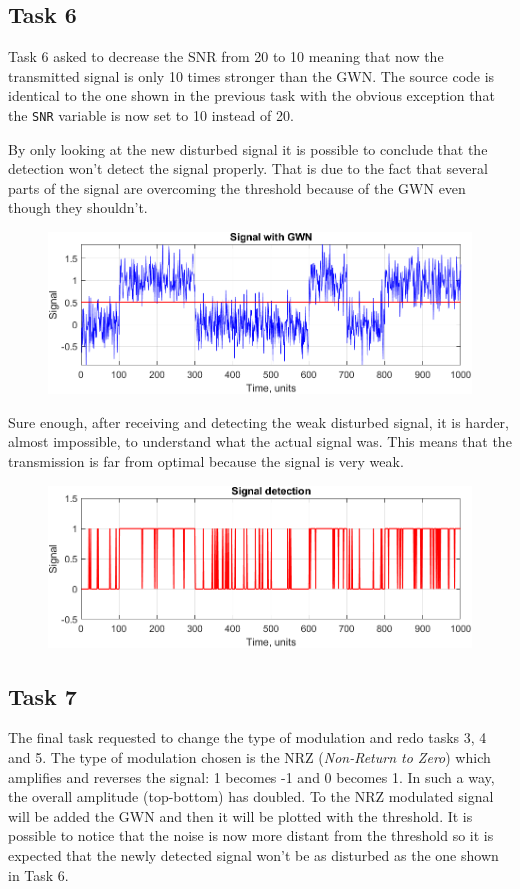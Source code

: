 % 
\subsection*{Task 6}
Task 6 asked to decrease the SNR from 20 to 10 meaning that now the transmitted signal is only 10 times stronger than the GWN. The source code is identical to the one shown in the previous task with the obvious exception that the \texttt{SNR} variable is now set to 10 instead of 20. 

By only looking at the new disturbed signal it is possible to conclude that the detection won't detect the signal properly. That is due to the fact that several parts of the signal are overcoming the threshold because of the GWN even though they shouldn't.
\begin{figure}[h!]
    \centering
    \includegraphics[width = .8\textwidth]{lab-1/imgs/noise_SNR10.png}
\end{figure}

\FloatBarrier\noindent Sure enough, after receiving and detecting the weak disturbed signal, it is harder, almost impossible, to understand what the actual signal was. This means that the transmission is far from optimal because the signal is very weak.

\begin{figure}[h!]
    \centering
    \includegraphics[width = .8\textwidth]{lab-1/imgs/noise_detection_SNR10.png}
\end{figure}

% 
\subsection*{Task 7}
The final task requested to change the type of modulation and redo tasks 3, 4 and 5. The type of modulation chosen is the NRZ (\textit{Non-Return to Zero}) which amplifies and reverses the signal: 1 becomes -1 and 0 becomes 1. In such a way, the overall amplitude (top-bottom) has doubled. To the NRZ modulated signal will be added the GWN and then it will be plotted with the threshold. It is possible to notice that the noise is now more distant from the threshold so it is expected that the newly detected signal won't be as disturbed as the one shown in Task 6.

